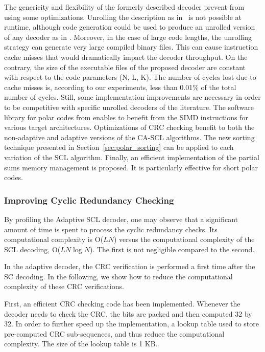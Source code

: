 The genericity and flexibility of the formerly described decoder prevent from
using some optimizations. Unrolling the description as in~\cite{Sarkis2016} is
not possible at runtime, although code generation could be used to produce an
unrolled version of any decoder as in \cite{Cassagne2015c}. Moreover, in the
case of large code lengths, the unrolling strategy can generate very large
compiled binary files. This can cause instruction cache misses that would
dramatically impact the decoder throughput. On the contrary, the size of the
executable files of the proposed decoder are constant with respect to the code
parameters (N, L, K). The number of cycles lost due to cache misses is,
according to our experiments, less than 0.01\% of the total number of cycles.
Still, some implementation improvements are necessary in order to be competitive
with specific unrolled decoders of the literature. The software library for
polar codes from \cite{Cassagne2015c,Cassagne2016b} enables to benefit from
the SIMD instructions for various target architectures. Optimizations of CRC
checking benefit to both the non-adaptive and adaptive versions of the CA-SCL
algorithms. The new sorting technique presented in
Section~\ref{sec:polar_sorting} can be applied to each variation of the SCL
algorithm. Finally, an efficient implementation of the partial sums memory
management is proposed. It is particularly effective for short polar codes.

\subsubsection{Improving Cyclic Redundancy Checking}
\label{sec:polar_crc}

By profiling the Adaptive SCL decoder, one may observe that a significant amount
of time is spent to process the cyclic redundancy checks. Its computational
complexity is O($LN$) versus the computational complexity of the SCL decoding,
O($LN\log N$). The first is not negligible compared to the second.

In the adaptive decoder, the CRC verification is performed a first time after
the SC decoding. In the following, we show how to reduce the computational
complexity of these CRC verifications.

First, an efficient CRC checking code has been implemented. Whenever the decoder
needs to check the CRC, the bits are packed and then computed 32 by 32. In order
to further speed up the implementation, a lookup table used to store
pre-computed CRC sub-sequences, and thus reduce the computational complexity.
The size of the lookup table is 1 KB.

